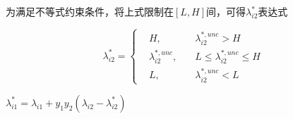 \documentclass[UTF8]{ctexart}
\begin{document}
为满足不等式约束条件，将上式限制在$[L,H]$间，可得$\lambda_{i2}^*$表达式

\begin{center}
    $$ \lambda_{i2}^*=\left\{
        \begin{array}{rcl}
             & H                    ,\quad & {\lambda_{i2}^{*,unc}>H}             \\
             & \lambda_{i2}^{*,unc} ,\quad & {L \leq \lambda_{i2}^{*,unc} \leq H} \\
             & L                    ,\quad & {\lambda_{i2}^{*,unc}<L}
        \end{array}
        \right. $$

    $\lambda_{i1}^*=\lambda_{i1}+y_1y_2(\lambda_{i2}-\lambda_{i2}^*)$
\end{center}




\end{document}
